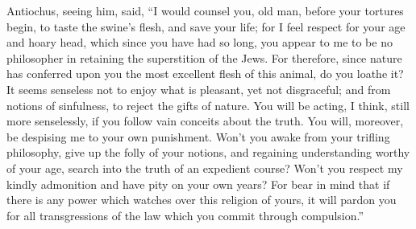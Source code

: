  Antiochus, seeing him, said,  ``I would counsel
you, old man, before your tortures begin, to taste the swine's flesh,
and save your life; for I feel respect for your age and hoary head,
which since you have had so long, you appear to me to be no philosopher
in retaining the superstition of the Jews.  For therefore,
since nature has conferred upon you the most excellent flesh of this
animal, do you loathe it?  It seems senseless not to enjoy
what is pleasant, yet not disgraceful; and from notions of sinfulness,
to reject the gifts of nature.  You will be acting, I think,
still more senselessly, if you follow vain conceits about the truth.
 You will, moreover, be despising me to your own
punishment.  Won't you awake from your trifling philosophy,
give up the folly of your notions, and regaining understanding worthy of
your age, search into the truth of an expedient course? 
Won't you respect my kindly admonition and have pity on your own years?
 For bear in mind that if there is any power which watches
over this religion of yours, it will pardon you for all transgressions
of the law which you commit through compulsion.''

